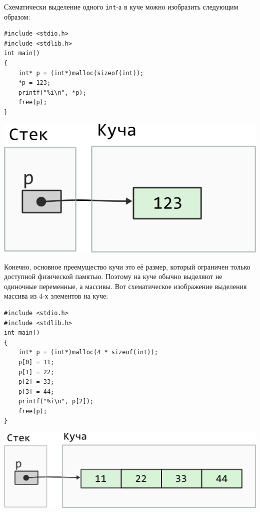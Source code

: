 \documentclass{article}
\begin{document}
Схематически выделение одного \texttt{int}-а в куче можно изобразить следующим образом:
 
 
\noindent\begin{minipage}{.50\textwidth}
\begin{lstlisting}
#include <stdio.h>
#include <stdlib.h>
int main()
{
    int* p = (int*)malloc(sizeof(int));
    *p = 123;
    printf("%i\n", *p);
    free(p);
}
\end{lstlisting}
\end{minipage}\hfill
\begin{minipage}{.40\textwidth}
\includegraphics[scale=0.7]{../images/malloc_class_tasks/heap_int.png}
\end{minipage} 

Конечно, основное преемущество кучи это её размер, который ограничен только доступной физической памятью. Поэтому на куче обычно выделяют не одиночные переменные, а массивы. Вот схематическое изображение выделения массива из 4-х элементов на куче:\\
\noindent\begin{minipage}{.50\textwidth}
\begin{lstlisting}
#include <stdio.h>
#include <stdlib.h>
int main()
{
    int* p = (int*)malloc(4 * sizeof(int));
    p[0] = 11;
    p[1] = 22;
    p[2] = 33;
    p[3] = 44;
    printf("%i\n", p[2]);
    free(p);
}
\end{lstlisting}
\end{minipage}
\begin{minipage}{.40\textwidth}
\includegraphics[scale=0.68]{../images/malloc_class_tasks/heap_int_array.png}
\end{minipage}
\end{document}
